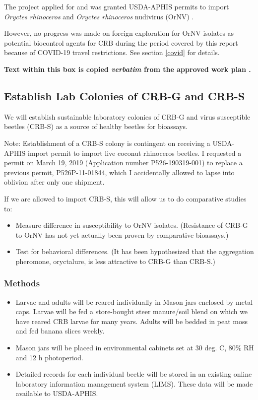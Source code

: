 \documentclass[12pt,letterpaper,english,bibliography=totocnumbered,abstract=on]{scrartcl}
\begin{document}
The project applied for and was granted USDA-APHIS permits to import \textit{Oryctes rhinoceros} \cite{usda-aphis_crb_2019} and \textit{Oryctes rhinoceros} nudivirus (OrNV) \cite{usda-aphisImportPermitOrNV2020}.

However, no progress was made on foreign exploration for OrNV isolates as potential biocontrol agents for CRB during the period covered by this report because of COVID-19 travel restrictions. See section \ref{covid} for details.

\newpage
\begin{framed}
	
\textbf{Text within this box is copied \emph{verbatim} from the approved work plan \cite{mooreWorkPlanAPHISPPA2020}.} 
	
\subsection{Establish Lab Colonies of CRB-G and CRB-S}

We will establish sustainable laboratory colonies of CRB-G and virus susceptible beetles (CRB-S) as a source of healthy beetles for bioassays.

Note: Establishment of a CRB-S colony is contingent on receiving a USDA-APHIS import permit to import live coconut rhinoceros beetles. I requested a permit on March 19, 2019 (Application number P526-190319-001) to replace a previous permit, P526P-11-01844, which I accidentally allowed to lapse into oblivion after only one shipment.

If we are allowed to import CRB-S, this will allow us to do comparative studies to:

\begin{itemize}
\item Measure difference in susceptibility to OrNV isolates. (Resistance of CRB-G to OrNV has not yet actually been proven by comparative bioassays.)
\item Test for behavioral differences. (It has been hypothesized that the aggregation pheromone, oryctalure, is less attractive to CRB-G than CRB-S.)
\end{itemize}

\subsubsection*{Methods}

\begin{itemize}
	\item Larvae and adults will be reared individually in Mason jars enclosed by metal caps. Larvae will be fed a store-bought steer manure/soil blend on which we have reared CRB larvae for many years. Adults will be bedded in peat moss and fed banana slices weekly.
	\item Mason jars will be placed in environmental cabinets set at 30 deg. C, 80\% RH and 12 h photoperiod.
	\item Detailed records for each individual beetle will be stored in an existing online laboratory information management system (LIMS). These data will be made available to USDA-APHIS.
\end{itemize}
\end{framed}
\end{document}
